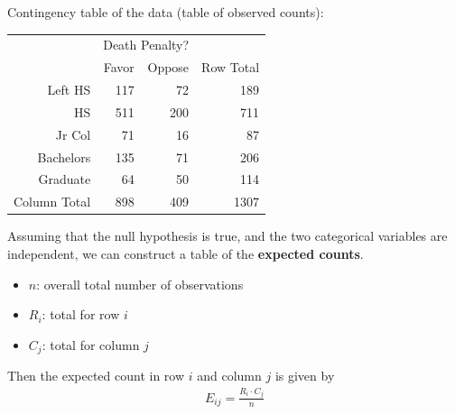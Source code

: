 \documentclass[10pt]{beamer}
\begin{document}
\begin{frame}

Contingency table of the data (table of observed counts):\\
\vspace{5pt}

\begin{table}[ht]
\centering
\begin{tabular}{rrrr}
\hline
\multicolumn{1}{c}{} &
\multicolumn{2}{c}{Death Penalty?} &
\multicolumn{1}{c}{}\\
\cline{2-3}
 & Favor & Oppose & Row Total \\
\hline
Left HS & 117 & 72 & 189 \\
HS & 511 & 200 & 711 \\
Jr Col & 71 & 16 & 87 \\
Bachelors & 135 & 71 & 206 \\
Graduate & 64 & 50 & 114 \\
\hline
Column Total & 898 & 409 & 1307 \\
\hline
\end{tabular}
\end{table}

\end{frame}


\begin{frame}
Assuming that the null hypothesis is true, and the two categorical variables are independent, we can construct a table of the \textbf{expected counts}.
\begin{itemize}
\item $n$: overall total number of observations\\
\item $R_i$: total for row $i$\\
\item $C_j$: total for column $j$\\
\end{itemize}
\vspace{10pt}

Then the expected count in row $i$ and column $j$ is given by
\begin{align*}
E_{ij} = \frac{R_i \cdot C_j}{n}
\end{align*}

\end{frame}
\end{document}
